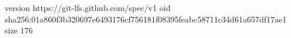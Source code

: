 version https://git-lfs.github.com/spec/v1
oid sha256:01a860f3b320697e6493176cf756181f08395feabc58711c34d61a657df17ae1
size 176
